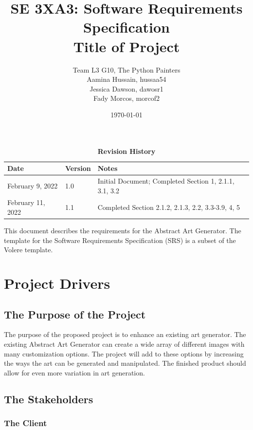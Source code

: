 \documentclass[12pt, titlepage]{article}
\title{SE 3XA3: Software Requirements Specification\\Title of Project}
\author{Team L3 G10, The Python Painters
		\\ Aamina Hussain, hussaa54
		\\ Jessica Dawson, dawosr1
		\\ Fady Morcos, morcof2
}
\date{\today}
\begin{document}
\maketitle

\tableofcontents
\listoftables
\listoffigures

\begin{table}[htp]
\caption{\bf Revision History}
\begin{tabularx}{\textwidth}{p{3cm}p{2cm}X}
\toprule {\bf Date} & {\bf Version} & {\bf Notes}\\
\midrule
February 9, 2022 & 1.0 & Initial Document; Completed Section 1, 2.1.1, 3.1, 3.2\\
February 11, 2022 & 1.1 & Completed Section 2.1.2, 2.1.3, 2.2, 3.3-3.9, 4, 5\\
\bottomrule
\end{tabularx}
\end{table}

\clearpage



This document describes the requirements for the Abstract Art Generator. The template for the Software
Requirements Specification (SRS) is a subset of the Volere template.%

\section{Project Drivers}

\subsection{The Purpose of the Project}

The purpose of the proposed project is to enhance an existing art generator. The existing Abstract Art Generator can create a wide array of different images with many customization options. The project will add to these options by increasing the ways the art can be generated and manipulated. The finished product should allow for even more variation in art generation.

\subsection{The Stakeholders}

\subsubsection{The Client}
\end{document}

